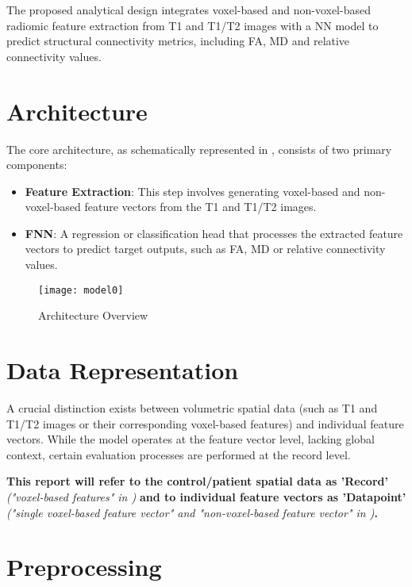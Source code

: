 The proposed analytical design integrates voxel-based and non-voxel-based radiomic feature extraction from T1 and T1/T2 images with a \ac{NN} model to predict structural connectivity metrics, including \ac{FA}, \ac{MD} and relative connectivity values.

\section{Architecture}

The core architecture, as schematically represented in , consists of two primary components:
\begin{itemize}
\item \textbf{Feature Extraction}: This step involves generating voxel-based and non-voxel-based feature vectors from the T1 and T1/T2 images.
\item \textbf{\ac{FNN}}: A regression or classification head that processes the extracted feature vectors to predict target outputs, such as \ac{FA}, \ac{MD} or relative connectivity values.
\end{itemize}

\begin{figure}[H]
\centering
\texttt{[image: model0]}
\caption{Architecture Overview}
\label{fig:model0}
\end{figure}

\section{Data Representation}

A crucial distinction exists between volumetric spatial data (such as T1 and T1/T2 images or their corresponding voxel-based features) and individual feature vectors. While the model operates at the feature vector level, lacking global context, certain evaluation processes are performed at the record level.\par
\textbf{This report will refer to the control/patient spatial data as 'Record'} \emph{("voxel-based features" in )} \textbf{and to individual feature vectors as 'Datapoint'} \emph{("single voxel-based feature vector" and "non-voxel-based feature vector" in )}\textbf{.}

\section{Preprocessing}
\label{sec:preproc}


